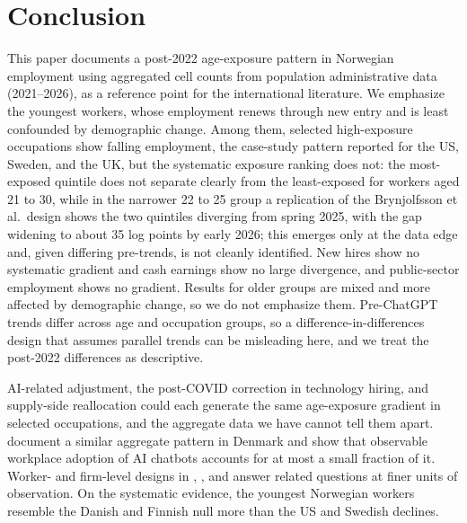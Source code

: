 \documentclass[12pt]{article}
\begin{document}
\section{Conclusion}
\label{sec:conclusion}

This paper documents a post-2022 age-exposure pattern in Norwegian employment using aggregated cell counts from population administrative data (2021--2026), as a reference point for the international literature. We emphasize the youngest workers, whose employment renews through new entry and is least confounded by demographic change. Among them, selected high-exposure occupations show falling employment, the case-study pattern reported for the US, Sweden, and the UK, but the systematic exposure ranking does not: the most-exposed quintile does not separate clearly from the least-exposed for workers aged 21 to 30, while in the narrower 22 to 25 group a replication of the Brynjolfsson et al.\ design shows the two quintiles diverging from spring 2025, with the gap widening to about 35 log points by early 2026; this emerges only at the data edge and, given differing pre-trends, is not cleanly identified. New hires show no systematic gradient and cash earnings show no large divergence, and public-sector employment shows no gradient. Results for older groups are mixed and more affected by demographic change, so we do not emphasize them. Pre-ChatGPT trends differ across age and occupation groups, so a difference-in-differences design that assumes parallel trends can be misleading here, and we treat the post-2022 differences as descriptive.

AI-related adjustment, the post-COVID correction in technology hiring, and supply-side reallocation could each generate the same age-exposure gradient in selected occupations, and the aggregate data we have cannot tell them apart. \citet{humlum2026} document a similar aggregate pattern in Denmark and show that observable workplace adoption of AI chatbots accounts for at most a small fraction of it. Worker- and firm-level designs in \citet{brynjolfsson2025}, \citet{lodefalk2026}, and \citet{humlum2026} answer related questions at finer units of observation. On the systematic evidence, the youngest Norwegian workers resemble the Danish and Finnish null more than the US and Swedish declines.


\end{document}
